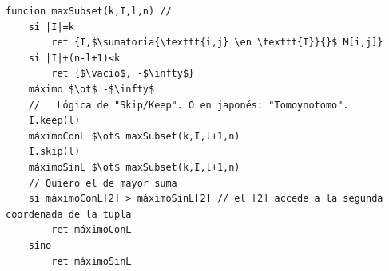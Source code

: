 \bigskip


\begin{tcolorbox}
  \begin{lstlisting}
funcion maxSubset(k,I,l,n) //
    si |I|=k
        ret {I,$\sumatoria{\texttt{i,j} \en \texttt{I}}{}$ M[i,j]}
    si |I|+(n-l+1)<k
        ret {$\vacio$, -$\infty$}
    máximo $\ot$ -$\infty$
    //   Lógica de "Skip/Keep". O en japonés: "Tomoynotomo".
    I.keep(l)
    máximoConL $\ot$ maxSubset(k,I,l+1,n)
    I.skip(l) 
    máximoSinL $\ot$ maxSubset(k,I,l+1,n)
    // Quiero el de mayor suma
    si máximoConL[2] > máximoSinL[2] // el [2] accede a la segunda coordenada de la tupla
        ret máximoConL
    sino
        ret máximoSinL\end{lstlisting}
\end{tcolorbox}

\fin
